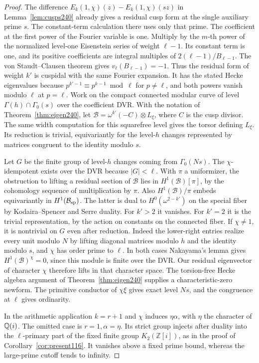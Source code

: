 \documentclass[a4paper,11pt]{article}
\theoremstyle{definition}
\theoremstyle{remark}
\newcommand{\ZZ}{\mathbb Z}\newcommand{\ord}{\operatorname{ord}}
\numberwithin{equation}{section}
\begin{document}
\begin{proof}
The difference \(E_k(1,\chi)(z)-E_k(1,\chi)(sz)\) in
Lemma~\ref{lem:cusps240} already gives a residual cusp form
at the single auxiliary prime \(s\). The constant-term
calculation there uses only that prime. The coefficient at the
first power of the Fourier variable is one. Multiply by the
\(m\)-th power of the normalized level-one Eisenstein series of
weight \(\ell-1\). Its constant term is one, and its positive
coefficients are integral multiples of \(2(\ell-1)/B_{\ell-1}\).
The von Staudt--Clausen theorem gives \(v_\ell(B_{\ell-1})=-1\).
Thus the residual form of weight \(k'\) is cuspidal with the
same Fourier expansion. It has the stated Hecke eigenvalues
because \(p^{k'-1}\equiv p^{k-1}\bmod\ell\) for \(p\ne\ell\),
and both powers vanish modulo \(\ell\) at \(p=\ell\). Work on the
compact connected modular curve of level
\(\Gamma(h)\cap\Gamma_0(s)\) over the coefficient DVR. With
the notation of Theorem~\ref{thm:eigen240}, let
\(\mathcal B=\omega^{k'}(-C)\otimes L_\xi\), where \(C\) is the
cusp divisor. The same width computation for this squarefree
level gives the torsor defining \(L_\xi\). Its reduction is
trivial, equivariantly for the level-\(h\) changes represented
by matrices congruent to the identity modulo \(s\).

Let \(G\) be the finite group of level-\(h\) changes coming from
\(\Gamma_0(Ns)\). The \(\chi\)-idempotent exists over the DVR
because \(|G|<\ell\). With \(\pi\) a uniformizer, the obstruction
to lifting a residual section of \(\mathcal B\) lies in
\(H^1(\mathcal B)[\pi]\), by the cohomology sequence of
multiplication by \(\pi\). Also \(H^1(\mathcal B)/\pi\) embeds
equivariantly in \(H^1(\mathcal B_{\rm sp})\). The latter is
dual to \(H^0(\omega^{2-k'})\) on the special fiber by
Kodaira--Spencer and Serre duality. For \(k'>2\) it vanishes.
For \(k'=2\) it is the trivial representation, by the action
on constants on the connected fiber. If \(\chi\ne1\), it is
nontrivial on \(G\) even after reduction. Indeed the
lower-right entries realize every unit modulo \(N\) by lifting
diagonal matrices modulo \(h\) and the identity modulo \(s\),
and \(\chi\) has order prime to \(\ell\). In both cases
Nakayama's lemma gives \(H^1(\mathcal B)^\chi=0\), since this
module is finite over the DVR. Our residual eigenvector of
character \(\chi\) therefore lifts in that character space.
The torsion-free Hecke algebra argument of
Theorem~\ref{thm:eigen240} supplies a characteristic-zero
newform. The primitive conductor of \(\chi\xi\) gives exact
level \(Ns\), and the congruence at \(\ell\) gives ordinarity.

In the arithmetic application \(k=r+1\) and \(\chi\) induces
\(\eta\alpha\), with \(\eta\) the character of \(\mathbb Q(i)\).
The omitted case is \(r=1,\alpha=\eta\). Its strict group
injects after duality into the \(\ell\)-primary part of the
fixed finite group \(K_2(\ZZ[i])\), as in the proof of
Corollary~\ref{cor:present116}. It vanishes above a fixed
prime bound, whereas the large-prime cutoff tends to infinity.
\end{proof}
\end{document}
